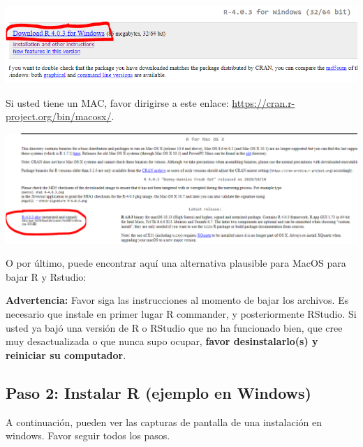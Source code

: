 \documentclass[
]{article}
\begin{document}
\begin{center}\includegraphics[width=11.76in]{./figs/Instalacion R- Win (0)} \end{center}

Si usted tiene un MAC, favor dirigirse a este enlace:
\url{https://cran.r-project.org/bin/macosx/}.

\begin{center}\includegraphics[width=17.75in]{./figs/Instalacion R- MAC (0)} \end{center}

O por último, puede encontrar aquí una alternativa plausible para MacOS
para bajar R y Rstudio:

\textbf{Advertencia:} Favor siga las instrucciones al momento de bajar
los archivos. Es necesario que instale en primer lugar R commander, y
posteriormente RStudio. Si usted ya bajó una versión de R o RStudio que
no ha funcionado bien, que cree muy desactualizada o que nunca supo
ocupar, \textbf{favor desinstalarlo(s) y reiniciar su computador}.

\hypertarget{paso-2-instalar-r-ejemplo-en-windows}{%
\subsection{Paso 2: Instalar R (ejemplo en
Windows)}\label{paso-2-instalar-r-ejemplo-en-windows}}

A continuación, pueden ver las capturas de pantalla de una instalación
en windows. Favor seguir todos los pasos.
\end{document}
